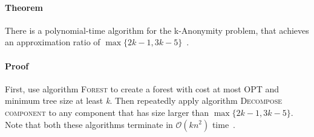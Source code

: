 \paragraph{Theorem}  There is a polynomial-time algorithm for the k-Anonymity problem, that achieves an approximation ratio of \(\max \{ 2k-1, 3k-5 \} \)~\cite{aggarwal}.

\paragraph{Proof} First, use algorithm \textsc{Forest} to create a forest with cost at most OPT and minimum tree size at least \textit{k}.
Then repeatedly apply algorithm \textsc{Decompose component} to any component that has size larger than \(\max \{ 2k-1, 3k-5 \} \).
Note that both these algorithms terminate in \(\mathcal{O}(kn^2)\) time~\cite{aggarwal}.